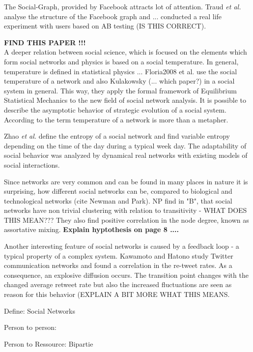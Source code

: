 \documentclass[a4paper,10pt]{scrbook}
\begin{document}
The Social-Graph, provided by Facebook attracts lot of attention. Traud \textit{et al.} \cite{Traud2011} analyse the structure of the Facebook graph and ... conducted a real life experiment with users based on AB testing (IS THIS CORRECT).

\textbf{FIND THIS PAPER !!! }\\

A deeper relation between social science, which is focused on the elements which form social networks and physics is based on a social temperature. In general, temperature is defined in statistical physics ... 
Floria2008 et al. \cite{Floria2008} use the social temperature of a network and also Kulakowsky (... which paper?) in a social system in general. This way, they apply the formal framework of Equilibrium Statistical Mechanics to the new field of social network analysis. It is possible to describe the asymptotic behavior of strategic evolution of a social system. According to \cite{Floria2008} the term temperature of a network is more than a metapher.

Zhao \textit{et al.}   \cite{Zaho2011} define the entropy of a social network and find variable entropy depending on the time of the day during a typical week day. The adaptability of social behavior was analyzed by dynamical real networks with existing models of social interactions. 

Since networks are very common and can be found in many places in nature it is surprising, how different social networks can be, compared to biological and technological networks (cite Newman and Park). NP find in "B", that social networks have non trivial clustering with relation to transitivity - WHAT DOES THIS MEAN??? They also find positive correlation in the node degree, known as assortative mixing.  \textbf{Explain hyptothesis on page 8 ....}

Another interesting feature of social networks is caused by a feedback loop - a typical property of a complex system. Kawamoto and Hatono study Twitter communication networks and found a correlation in the re-tweet rates. As a consequence, an explosive diffusion occurs. The transition point changes with the changed average retweet rate but also the increased fluctuations are seen as reason for this behavior (EXPLAIN A BIT MORE WHAT THIS MEANS. 


\cite{Traud2011}

Define: Social Networks

Person to person:

Person to Ressource: Bipartie 
\end{document}
